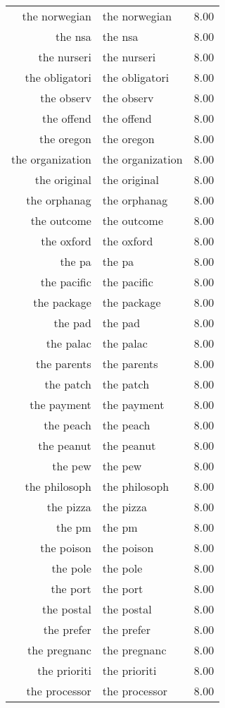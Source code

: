 \begin{table}[ht]
\begin{tabular}{rlr}
  the norwegian & the norwegian & 8.00 \\ 
  the nsa & the nsa & 8.00 \\ 
  the nurseri & the nurseri & 8.00 \\ 
  the obligatori & the obligatori & 8.00 \\ 
  the observ & the observ & 8.00 \\ 
  the offend & the offend & 8.00 \\ 
  the oregon & the oregon & 8.00 \\ 
  the organization & the organization & 8.00 \\ 
  the original & the original & 8.00 \\ 
  the orphanag & the orphanag & 8.00 \\ 
  the outcome & the outcome & 8.00 \\ 
  the oxford & the oxford & 8.00 \\ 
  the pa & the pa & 8.00 \\ 
  the pacific & the pacific & 8.00 \\ 
  the package & the package & 8.00 \\ 
  the pad & the pad & 8.00 \\ 
  the palac & the palac & 8.00 \\ 
  the parents & the parents & 8.00 \\ 
  the patch & the patch & 8.00 \\ 
  the payment & the payment & 8.00 \\ 
  the peach & the peach & 8.00 \\ 
  the peanut & the peanut & 8.00 \\ 
  the pew & the pew & 8.00 \\ 
  the philosoph & the philosoph & 8.00 \\ 
  the pizza & the pizza & 8.00 \\ 
  the pm & the pm & 8.00 \\ 
  the poison & the poison & 8.00 \\ 
  the pole & the pole & 8.00 \\ 
  the port & the port & 8.00 \\ 
  the postal & the postal & 8.00 \\ 
  the prefer & the prefer & 8.00 \\ 
  the pregnanc & the pregnanc & 8.00 \\ 
  the prioriti & the prioriti & 8.00 \\ 
  the processor & the processor & 8.00 \\ 

\end{tabular}
\end{table}
